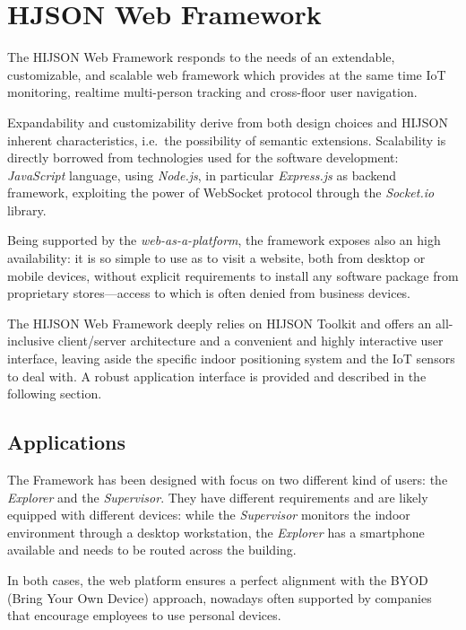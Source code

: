 \section{HJSON Web Framework}\label{hjson-web-framework}

The HIJSON Web Framework responds to the needs of an extendable,
customizable, and scalable web framework which provides at the same time IoT
monitoring, realtime multi-person tracking and cross-floor user
navigation.

Expandability and customizability derive from both design choices and
HIJSON inherent characteristics, i.e.~the possibility of semantic extensions.
Scalability is directly borrowed from technologies used for the
software development: \emph{JavaScript} language, using \emph{Node.js},
in particular \emph{Express.js} as backend framework, exploiting the
power of WebSocket protocol through the \emph{Socket.io} library.

Being supported by the \emph{web-as-a-platform}, the framework exposes
also an high availability: it is so simple to use as to visit a
website, both from desktop or mobile devices, without explicit
requirements to install any software package from proprietary stores---access to
which is often denied from business devices.

The HIJSON Web Framework deeply relies on HIJSON Toolkit and offers an
all-inclusive client/server architecture and a convenient and highly interactive
user interface, leaving aside the specific indoor positioning system and
the IoT sensors to deal with. A robust application interface is provided and
described in the following section.

\subsection{Applications}\label{applications}

The Framework has been designed with focus on two different kind of
users: the \emph{Explorer} and the \emph{Supervisor}. They have
different requirements and are likely equipped with different devices:
while the \emph{Supervisor} monitors the indoor environment through a
desktop workstation, the \emph{Explorer} has a smartphone available and
needs to be routed across the building.

In both cases, the web platform ensures a perfect alignment with the
BYOD (Bring Your Own Device) approach, nowadays often supported by companies
that encourage employees to use personal devices.

